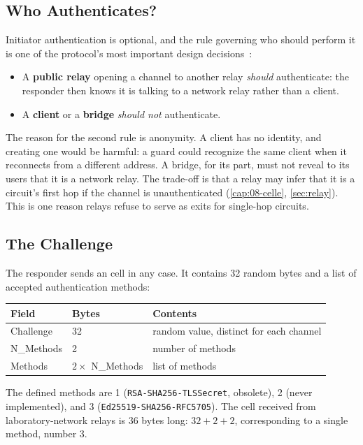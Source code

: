 \subsection{Who Authenticates?}

Initiator authentication is optional, and the rule governing who should perform it is one of the protocol's most important design decisions~:
\begin{itemize}
  \item A \textbf{public relay} opening a channel to another relay \emph{should} authenticate: the responder then knows it is talking to a network relay rather than a client.
  \item A \textbf{client} or a \textbf{bridge} \emph{should not} authenticate.
\end{itemize}
The reason for the second rule is anonymity. A client has no identity, and creating one would be harmful: a guard could recognize the same client when it reconnects from a different address. A bridge, for its part, must not reveal to its users that it is a network relay. The trade-off is that a relay may infer that it is a circuit's first hop if the channel is unauthenticated (\cref{cap:08-celle}, \cref{sec:relay}). This is one reason relays refuse to serve as exits for single-hop circuits.

\subsection{The Challenge}

The responder sends an  cell in any case. It contains 32 random bytes and a list of accepted authentication methods:

\begin{center}
\begin{tabular}{lll}
\toprule
Field & Bytes & Contents \\
\midrule
Challenge & 32 & random value, distinct for each channel \\
N\_Methods & 2 & number of methods \\
Methods & $2 \times$ N\_Methods & list of methods \\
\bottomrule
\end{tabular}
\end{center}

The defined methods are 1 (\texttt{RSA-SHA256-TLSSecret}, obsolete), 2 (never implemented), and 3 (\texttt{Ed25519-SHA256-RFC5705}). The cell received from laboratory-network relays is 36 bytes long: $32 + 2 + 2$, corresponding to a single method, number 3.

